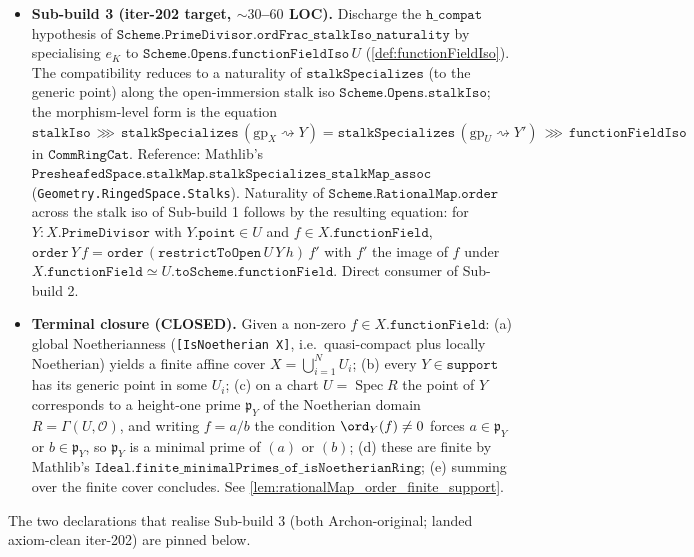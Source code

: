\begin{itemize}
    \(\texttt{ordMonoidWithZeroHom\_ringEquiv}\) on numerator and
    denominator.
  \item \textbf{Sub-build 3 (iter-202 target, \(\sim 30\)--\(60\) LOC).}
    Discharge the \(\texttt{h\_compat}\) hypothesis of
    \(\texttt{Scheme.PrimeDivisor.ordFrac\_stalkIso\_naturality}\)
    by specialising \(e_K\) to
    \(\texttt{Scheme.Opens.functionFieldIso}\,U\) (\ref{def:functionFieldIso}).
    The compatibility reduces to a naturality of
    \(\texttt{stalkSpecializes}\) (to the generic point) along the
    open-immersion stalk iso \(\texttt{Scheme.Opens.stalkIso}\); the
    morphism-level form is the equation
    \(\texttt{stalkIso} \,\ggg\, \texttt{stalkSpecializes}\,(\text{gp}_X \rightsquigarrow Y)
     = \texttt{stalkSpecializes}\,(\text{gp}_U \rightsquigarrow Y')
       \,\ggg\, \texttt{functionFieldIso}\)
    in \(\texttt{CommRingCat}\). Reference: Mathlib's
    \(\texttt{PresheafedSpace.stalkMap.stalkSpecializes\_stalkMap\_assoc}\)
    (\texttt{Geometry.RingedSpace.Stalks}). Naturality of
    \(\texttt{Scheme.RationalMap.order}\) across the stalk iso of
    Sub-build 1 follows by the resulting equation: for
    \(Y : X.\texttt{PrimeDivisor}\) with \(Y.\texttt{point} \in U\)
    and \(f \in X.\texttt{functionField}\),
    \(\texttt{order}\,Y\,f
     = \texttt{order}\,(\texttt{restrictToOpen}\,U\,Y\,h)\,f'\)
    with \(f'\) the image of \(f\) under
    \(X.\texttt{functionField} \simeq U.\texttt{toScheme}.\texttt{functionField}\).
    Direct consumer of Sub-build 2.
  \item \textbf{Terminal closure (CLOSED).}
    Given a non-zero \(f \in X.\texttt{functionField}\):
    (a) global Noetherianness (\texttt{[IsNoetherian X]}, i.e.\ quasi-compact
    plus locally Noetherian) yields a finite affine cover
    \(X = \bigcup_{i=1}^N U_i\); (b) every \(Y \in \texttt{support}\) has its
    generic point in some \(U_i\); (c) on a chart
    \(U = \operatorname{Spec} R\) the point of \(Y\) corresponds to a
    height-one prime \(\mathfrak p_Y\) of the Noetherian domain
    \(R = \Gamma(U, \mathcal O)\), and writing \(f = a/b\) the condition
    \(\ord_Y(f) \ne 0\) forces \(a \in \mathfrak p_Y\) or
    \(b \in \mathfrak p_Y\), so \(\mathfrak p_Y\) is a minimal prime of
    \((a)\) or \((b)\); (d) these are finite by Mathlib's
    \(\texttt{Ideal.finite\_minimalPrimes\_of\_isNoetherianRing}\); (e)
    summing over the finite cover concludes. See
    \ref{lem:rationalMap_order_finite_support}.
\end{itemize}

The two declarations that realise Sub-build 3 (both
Archon-original; landed axiom-clean iter-202) are pinned below.

